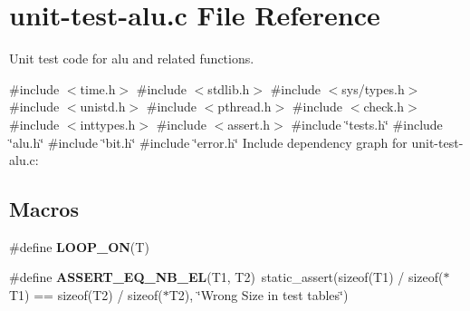 \hypertarget{unit-test-alu_8c}{}\section{unit-\/test-\/alu.c File Reference}
\label{unit-test-alu_8c}


Unit test code for alu and related functions.  


{\ttfamily \#include $<$time.\+h$>$}\newline
{\ttfamily \#include $<$stdlib.\+h$>$}\newline
{\ttfamily \#include $<$sys/types.\+h$>$}\newline
{\ttfamily \#include $<$unistd.\+h$>$}\newline
{\ttfamily \#include $<$pthread.\+h$>$}\newline
{\ttfamily \#include $<$check.\+h$>$}\newline
{\ttfamily \#include $<$inttypes.\+h$>$}\newline
{\ttfamily \#include $<$assert.\+h$>$}\newline
{\ttfamily \#include \char`\"{}tests.\+h\char`\"{}}\newline
{\ttfamily \#include \char`\"{}alu.\+h\char`\"{}}\newline
{\ttfamily \#include \char`\"{}bit.\+h\char`\"{}}\newline
{\ttfamily \#include \char`\"{}error.\+h\char`\"{}}\newline
Include dependency graph for unit-\/test-\/alu.c\+:
\subsection*{Macros}
\begin{DoxyCompactItemize}
\item 
\#define {\bfseries L\+O\+O\+P\+\_\+\+ON}(T)
\item 
\mbox{\label{unit-test-alu_8c_a412e475035f76eb4fed2cfd999c8d89c}} 
\#define {\bfseries A\+S\+S\+E\+R\+T\+\_\+\+E\+Q\+\_\+\+N\+B\+\_\+\+EL}(T1,  T2)~static\+\_\+assert(sizeof(T1) / sizeof($\ast$T1) == sizeof(T2) / sizeof($\ast$T2), \char`\"{}Wrong Size in test tables\char`\"{})
\end{DoxyCompactItemize}
